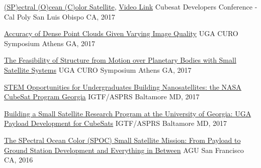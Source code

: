 \documentclass[10pt,a4paper]{article}
\begin{document}
\headedsection
  {{\color{bluegreen} \faTelevision} \href{http://smallsat.uga.edu/images/documents/presentations/UGAWorkshop2017CubeSatDeveloper.pdf}{(SP)ectral (O)cean (C)olor Satellite}, \href{https://youtu.be/QDb6PAgxWv0?t=9846}{ {\color{bluegreen} \faYoutubePlay} Video Link}}{%
  \headedsubsection
    {Cubesat Developers Conference - Cal Poly}
    {San Luis Obispo CA, 2017}
    {}
}

\headedsection
  {{\color{bluegreen} \faMapO} \href{http://smallsat.uga.edu/images/documents/posters/nirav_curo_poster.pdf}{Accuracy of Dense Point Clouds Given Varying Image Quality}}{%
  \headedsubsection
    {UGA CURO Symposium}
    {Athens GA, 2017}
    {}
}

\headedsection
  {{\color{bluegreen} \faTelevision} \href{http://smallsat.uga.edu/images/documents/presentations/Space_SFM-2017_CURO_Syposium.pdf}{The Feasibility of Structure from Motion over Planetary Bodies with Small Satellite Systems}}{%
  \headedsubsection
    {UGA CURO Symposium}
    {Athens GA, 2017}
    {}
}

\headedsection
  {{\color{bluegreen} \faTelevision} \href{http://smallsat.uga.edu/images/documents/posters/2017-ASPRS-IGTF-1-STEMopprotunities.pdf}{STEM Opportunities for Undergraduates Building Nanosatellites: the NASA CubeSat Program Georgia}}{%
  \headedsubsection
    {IGTF/ASPRS}
    {Baltamore MD, 2017}
    {}
}

\headedsection
  {{\color{bluegreen} \faTelevision} \href{http://smallsat.uga.edu/images/documents/posters/2017-ASPRS-IGTF-2-PayloadDevelopment.pdf}{Building a Small Satellite Research Program at the University of Georgia: UGA Payload Development for CubeSats}}{%
  \headedsubsection
    {IGTF/ASPRS}
    {Baltamore MD, 2017}
    {}
}

\headedsection
  {{\color{bluegreen} \faMapO} \href{http://smallsat.uga.edu/images/documents/posters/AGU2016-SPOC-final2.pdf}{The SPectral Ocean Color (SPOC) Small Satellite Mission: From Payload to Ground Station Development and Everything in Between}}{%
  \headedsubsection
    {AGU}
    {San Francisco CA, 2016}
    {}
}
\end{document}
